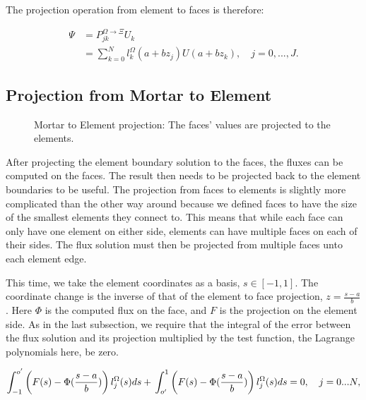The projection operation from element to faces is therefore:

\begin{align}  \label{projection_element_to_face}
	\Psi &= P_{jk}^{\Omega \rightarrow \Xi} U_k  \\
	&= \sum_{k = 0}^{N}l_k ^ \Omega(a+ b z_j) U(a + b z_k), \quad j = 0, ..., J.
\end{align}

\subsection{Projection from Mortar to Element} \label{subsection:adaptive_mesh_refinement:mortar_element_method:mortar_to_element}

\begin{figure}[H]
	\centering
	
	\caption{Mortar to Element projection: The faces' values are projected to the elements.}
	\label{fig:mortar_to_element}
\end{figure}

After projecting the element boundary solution to the faces, the fluxes can be computed on the
faces. The result then needs to be projected back to the element boundaries to be useful. The
projection from faces to elements is slightly more complicated than the other way around because we
defined faces to have the size of the smallest elements they connect to. This means that while each
face can only have one element on either side, elements can have multiple faces on each of their
sides. The flux solution must then be projected from multiple faces unto each element edge.

This time, we take the element coordinates as a basis, $s \in [-1, 1]$. The coordinate change is the
inverse of that of the element to face projection, $z = \frac{s - a}{b}$. Here $\Phi$ is the
computed flux on the face, and $F$ is the projection on the element side. As in the last subsection,
we require that the integral of the error between the flux solution and its projection multiplied by
the test function, the Lagrange polynomials here, be zero.

\begin{equation} \label{equ:zero_error_to_element}
	\int_{-1}^{o'} \left( F(s) - \Phi (\frac{s - a}{b}) \right) l_j^\Omega(s)ds + \\
	\int_{o'}^{1} \left( F(s) - \Phi (\frac{s - a}{b}) \right) l_j^\Omega (s)ds = 0, \\
	\quad j = 0...N,
\end{equation}

